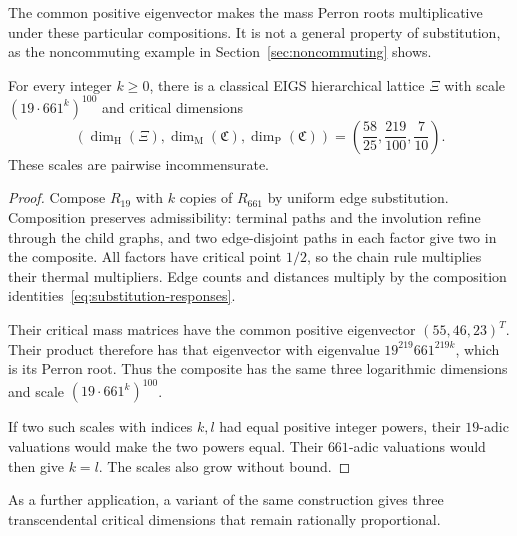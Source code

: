 The common positive eigenvector makes the mass Perron roots multiplicative under these particular compositions. It is not a general property of substitution, as the noncommuting example in Section~\ref{sec:noncommuting} shows.
\begin{theorem}\label{cor:infinite-scales}\label{thm:infinite-incommensurate-scales}
For every integer $k\ge0$, there is a classical EIGS hierarchical lattice $\Xi$ with scale $(19\cdot661^k)^{100}$ and critical dimensions
\[
 (\dim_{\mathrm H}(\Xi),\dim_{\mathrm M}(\mathfrak C),\dim_{\mathrm P}(\mathfrak C))
 =\left(\frac{58}{25},\frac{219}{100},\frac7{10}\right).
\]
These scales are pairwise incommensurate.
\end{theorem}
\begin{proof}
Compose $R_{19}$ with $k$ copies of $R_{661}$ by uniform edge substitution. Composition preserves admissibility: terminal paths and the involution refine through the child graphs, and two edge-disjoint paths in each factor give two in the composite. All factors have critical point $1/2$, so the chain rule multiplies their thermal multipliers. Edge counts and distances multiply by the composition identities~\eqref{eq:substitution-responses}.

Their critical mass matrices have the common positive eigenvector $(55,46,23)^T$. Their product therefore has that eigenvector with eigenvalue $19^{219}661^{219k}$, which is its Perron root. Thus the composite has the same three logarithmic dimensions and scale $(19\cdot661^k)^{100}$.

If two such scales with indices $k,l$ had equal positive integer powers, their $19$-adic valuations would make the two powers equal. Their $661$-adic valuations would then give $k=l$. The scales also grow without bound.
\end{proof}


As a further application, a variant of the same construction gives three transcendental critical dimensions that remain rationally proportional.

